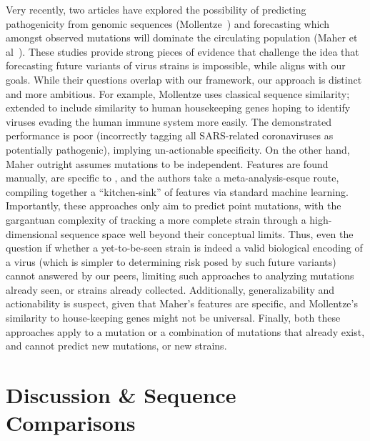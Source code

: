 \documentclass[onecolumn, compsoc,10pt]{IEEEtran}
\begin{document}
Very recently, two articles have explored the possibility of predicting  pathogenicity from genomic sequences (Mollentze~\cite{mollentze2021identifying}) and forecasting which amongst observed mutations will dominate the circulating population (Maher et al~\cite{maher2021predicting}). These studies provide strong pieces of evidence that challenge the idea that forecasting future variants of virus strains is impossible, while aligns with our goals. While their questions overlap with our framework, our approach is distinct and more ambitious. For example,  Mollentze  uses  classical  sequence similarity; extended to include similarity to  human housekeeping genes hoping to identify viruses  evading the human immune system more easily.  The demonstrated  performance is poor (incorrectly tagging all SARS-related coronaviruses as potentially pathogenic), implying un-actionable specificity. On the other hand,  Maher outright assumes mutations to be independent. Features are found manually,  are specific to \hcov, and the authors take  a meta-analysis-esque route, compiling together a ``kitchen-sink'' of features via standard machine learning. Importantly, these approaches  only aim to predict point mutations, with  the gargantuan complexity of tracking a more complete strain through a high-dimensional sequence space well beyond their conceptual limits. Thus, even the question if whether a yet-to-be-seen strain is indeed a valid biological encoding of a virus (which is simpler to determining risk posed by such future variants) cannot answered by our peers, limiting such approaches to analyzing mutations already seen, or strains  already collected.  Additionally, generalizability and actionability is  suspect, given that Maher's features are \hcov specific, and Mollentze's similarity to house-keeping genes might not be universal. Finally, both these  approaches apply to a mutation or a combination of mutations that already exist, and cannot predict new mutations, or new strains.






\section*{Discussion \& Sequence Comparisons}
\end{document}
